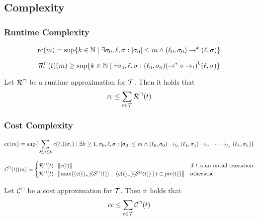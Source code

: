 \subsection{Complexity}

\subsubsection{Runtime Complexity}

\begin{definition}
	\[ \text{rc}(m) = \sup \lbrace  k \in \mathbb{N} \mid \exists \sigma_0, \ell, \sigma: \left|\sigma_0\right| \leq m \wedge (\ell_0, \sigma_0) \rightarrow^k (\ell, \sigma)  \rbrace \]
\end{definition}

\begin{definition}
	\[ {\mathcal{R}^\sqcap}(t)(m) \geq \sup \lbrace  k \in \mathbb{N} \mid \exists \sigma_0, \ell, \sigma: (\ell_0, \sigma_0) (\rightarrow^* \circ \rightarrow_t)^k (\ell, \sigma)  \rbrace \]
\end{definition}

\begin{theorem}
	Let ${\mathcal{R}^\sqcap}$ be a runtime approximation for $\mathcal{T}$.
	Then it holds that 
	\[ \mathit{rc} \leq \sum_{t \in \mathcal{T}}{\mathcal{R}^\sqcap}(t) \]
\end{theorem}

\subsubsection{Cost Complexity}

\begin{definition}
  \[ \text{cc}(m) = \sup \lbrace  \sum_{0 \leq i \leq k} c(t_i)(\sigma_i) \mid \exists k \geq 1, \sigma_0, \ell, \sigma: \left|\sigma_0\right| \leq m \wedge
    (\ell_{0}, \sigma_{0}) \rightarrow_{t_0} (\ell_{1}, \sigma_{1}) \rightarrow_{t_1} \dots \rightarrow_{t_k} (\ell_{k}, \sigma_{k})  \rbrace
  \]
\end{definition}

\begin{definition}
  \[ {\mathcal{C}^\sqcap}(t)(m) =
  \begin{cases}
    {\mathcal{R}^\sqcap}(t) \cdot \left\Vert c(t)\right\Vert & \text{if } t \text{ is an initial transition} \\
    {\mathcal{R}^\sqcap}(t) \cdot \left\Vert\max \lbrace (c(t)_+)({\mathcal{S}^\sqcap}(\tilde{t})) - (c(t)_-)({\mathcal{S}^\sqcup}(\tilde{t})) \mid \tilde{t} \in \mathit{pre}(t) \rbrace\right\Vert & \text{otherwise}
  \end{cases}
  \]
\end{definition}

\begin{theorem}
	Let ${\mathcal{C}^\sqcap}$ be a cost approximation for $\mathcal{T}$.
	Then it holds that 
	\[ \mathit{cc} \leq \sum_{t \in \mathcal{T}} {\mathcal{C}^\sqcap}(t) \]
\end{theorem}


